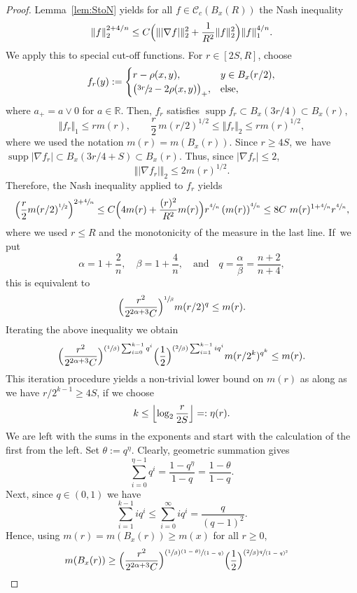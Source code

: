 \documentclass[JEP,XML,SOM,Unicode,published]{cedram}
\newcommand{\Psfrac}[2]{(\sfrac{#1}{#2})}
\newcommand{\pspfrac}[2]{\sfrac{(#1)}{(#2)}}
\theoremstyle{plain}
\theoremstyle{definition}
\newcommand{\cC}{\mathcal{C}}
\DeclareMathOperator{\supp}{supp}
\begin{document}
\begin{proof}
Lemma~\ref{lem:StoN} yields for all $f\in \cC_{c}(B_x(R))$ the Nash inequality
\[
\Vert f\Vert_2^{2+4/n}\leq C \Bigl(\Vert |\nabla f|\Vert_2^2+\frac{1}{R^2}\Vert f\Vert_2^2\Bigr)\Vert f\Vert_1^{4/n}.
\]
We apply this to special cut-off functions.
For {$r\in[2S,R]$}, choose
\[
f_r(y):=
\begin{cases}
{r}-\rho(x,y),& y\in B_{x}(r/2),\\
\bigl(\sfrac{3r}2-2\rho(x,y)\bigr)_+,&
\mbox{else},
\end{cases}
\]
where $a_+=a\vee0$ for $a\in \mathbb{R}$. Then, $f_r$ satisfies {$\supp f_r\subset B_x(3r/4)\subset B_x(r)$},
\[
\Vert f_r\Vert_1\leq {r} m(r), \quad
\quad \frac{r}{2}\,m(r/2)^{1/2}\leq \Vert f_r\Vert_2\leq {r} m(r)^{1/2},
\]
where we used the notation $ m(r)=m(B_{x}(r)) $.
Since {$ r\ge 4S $}, we~have
$\supp\vert \nabla f_r\vert\subset B_x(3r/4+S)\subset B_x(r)$. Thus, since $\vert \nabla f_r\vert\leq {2}$,
\[
\Vert \vert \nabla f_r\vert \Vert_2
\leq {2} m(r)^{1/2}.
\]
Therefore, the Nash inequality applied to $f_r$ yields
\[
\Bigl(\frac{r}2 m({r}/2)^{\sfrac12}\Bigr)^{2+\sfrac4n}
\leq
C \Bigl(4m(r)+\frac{({r})^2}{R^2}m({r})\Bigr)
{r}^{\sfrac4n}\left( m({r})\right)^{\sfrac4n}
\leq 8 C \ m(r)^{1+\sfrac4n}
r^{\sfrac4n},
\]
where we used {$ r\le R $} and the monotonicity of the measure in the last line. If~we
put
\[
\alpha=1+\frac2n,\quad \beta=1+\frac4n,\quad\text{and}\quad q=\frac\alpha\beta=\frac{n+2}{n+4},
\]
this is equivalent to
\[
\Bigl(\frac{r^2}{2^{2\alpha+3}C}\Bigr)^{\sfrac{1}{\beta}} m({r}/2)^{q}
\leq m(r).
\]
Iterating the above inequality we obtain
\[
\Bigl(\frac{r^2}{2^{2\alpha+3}C}\Bigr)^{\Psfrac{1}{\beta}\sum_{i=0}^{k-1}q^i}\Bigl(\frac12\Bigr)^{\Psfrac{2}{\beta}\sum_{i=1}^{k-1}iq^i}
m({r}/{2^k})^{q^k}
\leq m(r).
\]
This iteration procedure yields a non-trivial lower bound on $m(r)$ as along as we have $r/2^{k-1}\geq 4S$, \ie if we choose
\[
k\leq
\Bigl\lfloor \log_2\frac{r}{2 S}\Bigr\rfloor =:\eta(r).
\]
We are left with the sums in the exponents and start with the calculation of the first from the left. Set $\theta:=q^{\eta}$. Clearly, geometric summation gives
\[
\sum_{i=0}^{{\eta}-1}q^i=\frac{1-q^{{\eta}}}{1-q}=\frac{1-{{\theta}}}{1-q}.
\]
Next, since $q\in(0,1)$ we have
\[
\sum_{{i}=1}^{k-1}iq^{i}\leq \sum_{i=0}^\infty iq^i=\frac{q}{(q-1)^2}.
\]
Hence, using $m(r)=m(B_x(r))\geq m(x)$ for all $r\geq 0$,
{\begin{align*}
m(B_x(r))&\ge\Bigl(\frac{r^2}{2^{2\alpha+3} C }\Bigr)^{\Psfrac{1}{\beta}\pspfrac{1- {\theta}}{1-q}}
\Bigl({\frac 12}\Bigr)^{\Psfrac{2}{\beta}\sfrac{q}{(1-q)^2}}

\end{align*}}
\end{proof}
\end{document}
